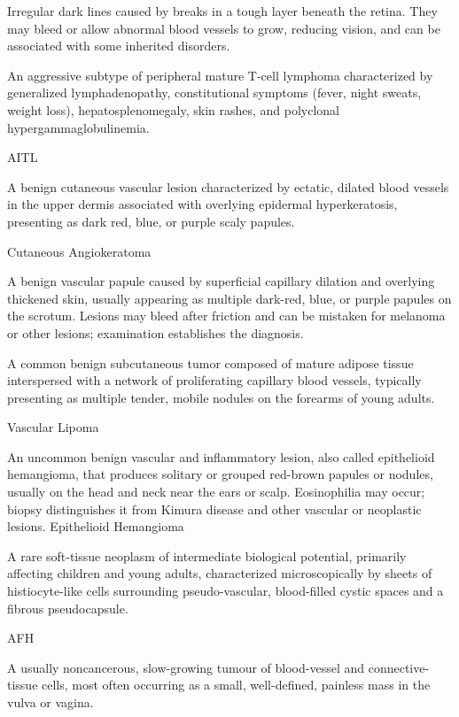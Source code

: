  Irregular dark lines caused by breaks in a tough layer beneath the retina. They may bleed or allow abnormal blood vessels to grow, reducing vision, and can be associated with some inherited disorders.

 An aggressive subtype of peripheral mature T-cell lymphoma characterized by generalized lymphadenopathy, constitutional symptoms (fever, night sweats, weight loss), hepatosplenomegaly, skin rashes, and polyclonal hypergammaglobulinemia.

\synonyms
AITL

 A benign cutaneous vascular lesion characterized by ectatic, dilated blood vessels in the upper dermis associated with overlying epidermal hyperkeratosis, presenting as dark red, blue, or purple scaly papules.

\synonyms
Cutaneous Angiokeratoma

 A benign vascular papule caused by superficial capillary dilation and overlying thickened skin, usually appearing as multiple dark-red, blue, or purple papules on the scrotum. Lesions may bleed after friction and can be mistaken for melanoma or other lesions; examination establishes the diagnosis.

 A common benign subcutaneous tumor composed of mature adipose tissue interspersed with a network of proliferating capillary blood vessels, typically presenting as multiple tender, mobile nodules on the forearms of young adults.

\synonyms
Vascular Lipoma

 An uncommon benign vascular and inflammatory lesion, also called epithelioid hemangioma, that produces solitary or grouped red-brown papules or nodules, usually on the head and neck near the ears or scalp. Eosinophilia may occur; biopsy distinguishes it from Kimura disease and other vascular or neoplastic lesions.
\synonyms
Epithelioid Hemangioma

 A rare soft-tissue neoplasm of intermediate biological potential, primarily affecting children and young adults, characterized microscopically by sheets of histiocyte-like cells surrounding pseudo-vascular, blood-filled cystic spaces and a fibrous pseudocapsule.

\synonyms
AFH

 A usually noncancerous, slow-growing tumour of blood-vessel and connective-tissue cells, most often occurring as a small, well-defined, painless mass in the vulva or vagina.

